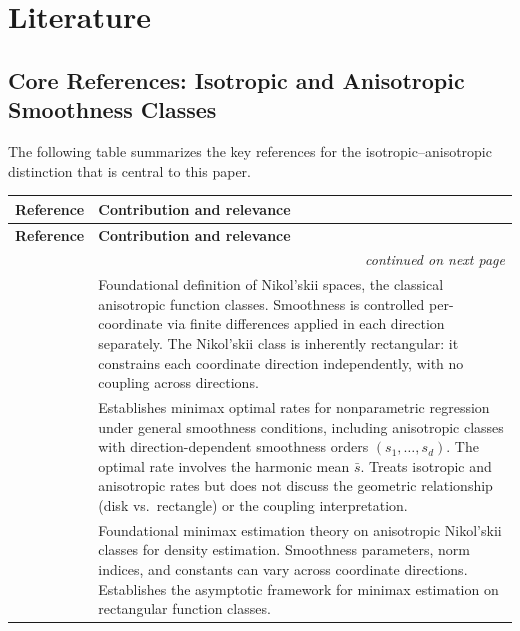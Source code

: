 \section{Literature}\label{sec:literature}


\subsection{Core References: Isotropic and Anisotropic Smoothness Classes}\label{sec:lit:core}

The following table summarizes the key references for the isotropic--anisotropic distinction that is central to this paper.

{\small
\begin{longtable}{p{4.5cm}p{10.5cm}}
\toprule
\textbf{Reference} & \textbf{Contribution and relevance} \\
\midrule
\endfirsthead
\toprule
\textbf{Reference} & \textbf{Contribution and relevance} \\
\midrule
\endhead
\midrule
\multicolumn{2}{r}{\emph{continued on next page}} \\
\bottomrule
\endfoot
\bottomrule
\endlastfoot

\textcite{nikolskii_approximation_1975} &
Foundational definition of Nikol'skii spaces, the classical anisotropic function classes. Smoothness is controlled per-coordinate via finite differences applied in each direction separately. The Nikol'skii class is inherently rectangular: it constrains each coordinate direction independently, with no coupling across directions. \\[6pt]

\textcite{stone_optimal_1980} &
Establishes minimax optimal rates for nonparametric regression under general smoothness conditions, including anisotropic classes with direction-dependent smoothness orders $(s_1, \ldots, s_d)$. The optimal rate involves the harmonic mean $\bar{s}$. Treats isotropic and anisotropic rates but does not discuss the geometric relationship (disk vs.\ rectangle) or the coupling interpretation. \\[6pt]

\textcite{ibragimov_statistical_1981} &
Foundational minimax estimation theory on anisotropic Nikol'skii classes for density estimation. Smoothness parameters, norm indices, and constants can vary across coordinate directions. Establishes the asymptotic framework for minimax estimation on rectangular function classes. \\[6pt]


\end{longtable}}
